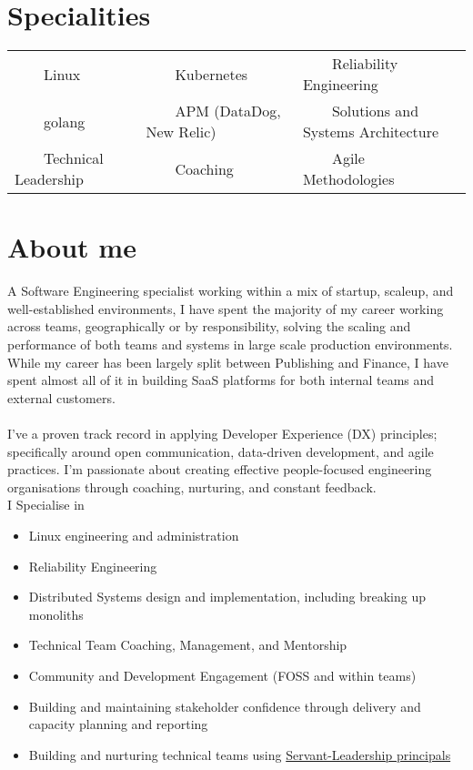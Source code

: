 \documentclass[11pt,a4paper,sans]{article}
\newcommand{\tabitem}{~~\llap{\textbullet}~~}
\begin{document}


\section{Specialities}
\begin{tabular}{lll}
  \tabitem Linux & \tabitem Kubernetes & \tabitem Reliability Engineering \\
  \tabitem golang & \tabitem APM (DataDog, New Relic) & \tabitem Solutions and Systems Architecture \\
  \tabitem Technical Leadership & \tabitem Coaching & \tabitem Agile Methodologies \\
\end{tabular}

\section{About me}
A Software Engineering specialist working within a mix of startup, scaleup, and well-established environments, I have spent the majority of my career working across teams, geographically or by responsibility, solving the scaling and performance of both teams and systems in large scale production environments. While my career has been largely split between Publishing and Finance, I have spent almost all of it in building SaaS platforms for both internal teams and external customers. \\
\\
I've a proven track record in applying Developer Experience (DX) principles; specifically around open communication, data-driven development, and agile practices. I'm passionate about creating effective people-focused engineering organisations through coaching, nurturing, and constant feedback.
\\
I Specialise in

\begin{itemize}
\item Linux engineering and administration
\item Reliability Engineering
\item Distributed Systems design and implementation, including breaking up monoliths
\item Technical Team Coaching, Management, and Mentorship
\item Community and Development Engagement (FOSS and within teams)
\item Building and maintaining stakeholder confidence through delivery and capacity planning and reporting
\item Building and nurturing technical teams using \href{https://www.mindtools.com/pages/article/servant-leadership.htm}{Servant-Leadership principals}
\end{itemize}
\end{document}

